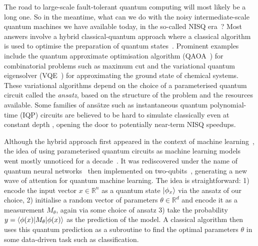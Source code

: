 The road to large-scale fault-tolerant quantum computing will most likely be a long one.
So in the meantime, what can we do with the noisy intermediate-scale quantum machines we have available today, in the so-called NISQ era~\cite{Preskill18}?
Most answers involve a hybrid classical-quantum approach where a classical algorithm is used to optimise the preparation of quantum states~\cite{McCleanEtAl16}.
Prominent examples include the quantum approximate optimisation algorithm (QAOA~\cite{FarhiEtAl14}) for combinatorial problems such as maximum cut and the variational quantum eigensolver (VQE~\cite{PeruzzoEtAl14}) for approximating the ground state of chemical systems.
These variational algorithms depend on the choice of a parameterised quantum circuit called the \emph{ansatz}, based on the structure of the problem and the resources available.
Some families of ansätze such as instantaneous quantum polynomial-time (IQP) circuits are believed to be hard to simulate classically even at constant depth \cite{ShepherdBremner09}, opening the door to potentially near-term NISQ speedups.

Although the hybrid approach first appeared in the context of machine learning~\cite{BangEtAl08}, the idea of using parameterised quantum circuits as machine learning models went mostly unnoticed for a decade~\cite{BenedettiEtAl19}.
It was rediscovered under the name of quantum neural networks~\cite{FarhiNeven18} then implemented on two-qubits~\cite{HavlicekEtAl19}, generating a new wave of attention for quantum machine learning.
The idea is straightforward: 1) encode the input vector ${x} \in \mathbb{R}^n$ as a quantum state $|\phi_{x}\rangle$ via the ansatz of our choice, 2) initialise a random vector of parameters ${\theta} \in \mathbb{R}^d$ and encode it as a measurement $M_\theta$, again via some choice of ansatz 3) take the probability $y = \langle\phi({x})| M_\theta |\phi({x})\rangle$ as the prediction of the model.
A classical algorithm then uses this quantum prediction as a subroutine to find the optimal parameters $\theta$ in some data-driven task such as classification.

